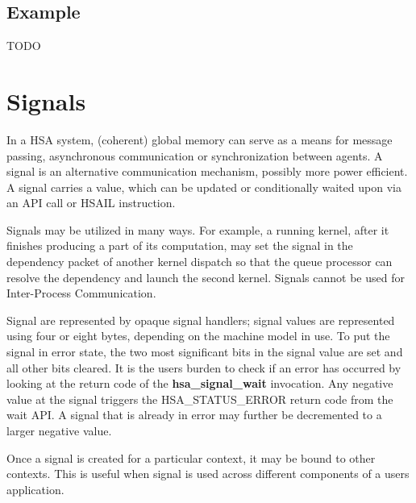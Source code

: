 \documentclass[final]{book}
\newcommand{\mariotodo}[1]{\todo[color=CarnationPink]{#1}}
\newcommand{\reffun}[1]{\textbf{#1}}
\newcommand{\reftyp}[1]{#1}
\newcommand{\refenu}[1]{\reftyp{#1}}
\begin{document}

% 

\hypertarget{topology_example}{} \subsection{Example}
TODO

\hypertarget{signals}{}\section{Signals}
\label{signals}

In a HSA system, (coherent) global memory can serve as a means for message
passing, asynchronous communication or synchronization between agents. A signal
is an alternative communication mechanism, possibly more power efficient. A
signal carries a value, which can be updated or conditionally waited upon via an
API call or HSAIL instruction.

Signals may be utilized in many ways. For example, a running kernel, after it
finishes producing a part of its computation, may set the signal in the
dependency packet of another kernel dispatch so that the queue processor can
resolve the dependency and launch the second kernel. Signals cannot be used for
Inter-Process Communication.

Signal are represented by opaque signal handlers; signal values are represented
using four or eight bytes, depending on the machine model in use. To put the
signal in error state, the two most significant bits in the signal value are set
and all other bits cleared. It is the users burden to check if an error has
occurred by looking at the return code of the \reffun{hsa_signal_wait}
invocation. Any negative value at the signal triggers the
\refenu{HSA_STATUS_ERROR} return code from the wait API. A signal that is
already in error may further be decremented to a larger negative value.

\mariotodo{signal creation missing}Once a signal is created for a particular
context, it may be bound to other contexts. This is useful when signal is used
across different components of a users application.
\end{document}
